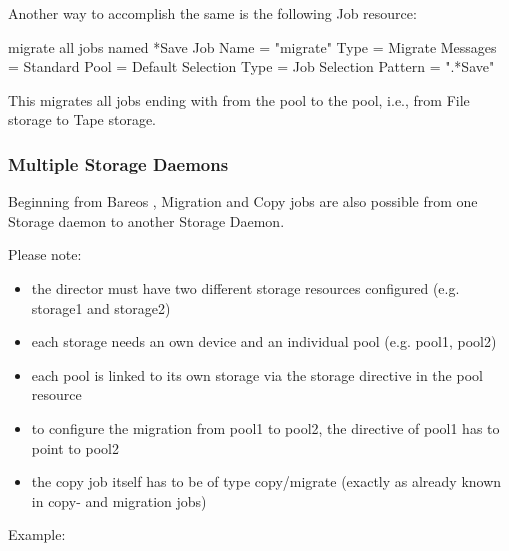 Another way to accomplish the same is the following Job resource:

\begin{bconfig}{migrate all jobs named *Save}
Job {
  Name = "migrate"
  Type = Migrate
  Messages = Standard
  Pool = Default
  Selection Type = Job
  Selection Pattern = ".*Save"
}
\end{bconfig}

This migrates all jobs ending with  from the 
pool to the  pool, i.e., from File storage to Tape storage.

\subsubsection{Multiple Storage Daemons}
    \label{sec:CopyMigrationJobsMultipleStorageDaemons}

Beginning from Bareos , 
Migration and Copy jobs are also possible from one Storage daemon to another Storage Daemon.

Please note:
\begin{itemize}
 \item the director must have two different storage resources configured (e.g. storage1 and storage2)
    \item each storage needs an own device and an individual pool (e.g. pool1, pool2)
    \item each pool is linked to its own storage via the storage directive in the pool resource
    \item to configure the migration from pool1 to pool2, the  directive of pool1 has to point to pool2
    \item the copy job itself has to be of type copy/migrate (exactly as already known in copy- and migration jobs)
\end{itemize}

Example:

